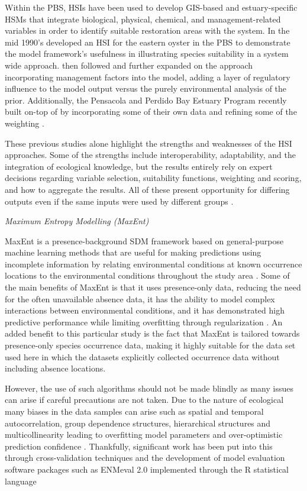 \documentclass[
  review]{elsarticle}
\begin{document}
Within the PBS, HSIs have been used to develop GIS-based and
estuary-specific HSMs that integrate biological, physical, chemical, and
management-related variables in order to identify suitable restoration
areas with the system. In the mid 1990's \citet{Christensen1997}
developed an HSI for the eastern oyster in the PBS to demonstrate the
model framework's usefulness in illustrating species suitability in a
system wide approach. \citet{Geselbracht2024} then followed and further
expanded on the approach incorporating management factors into the
model, adding a layer of regulatory influence to the model output versus
the purely environmental analysis of the prior. Additionally, the
Pensacola and Perdido Bay Estuary Program recently built on-top of
\citet{Geselbracht2024} by incorporating some of their own data and
refining some of the weighting \citep{PPBEP_OysterRestoration}.

These previous studies alone highlight the strengths and weaknesses of
the HSI approaches. Some of the strengths include interoperability,
adaptability, and the integration of ecological knowledge, but the
results entirely rely on expert decisions regarding variable selection,
suitability functions, weighting and scoring, and how to aggregate the
results. All of these present opportunity for differing outputs even if
the same inputs were used by different groups
\citep{Geselbracht2024, Johnson2005}.

\emph{Maximum Entropy Modelling (MaxEnt)}

MaxEnt is a presence-background SDM framework based on general-purpose
machine learning methods that are useful for making predictions using
incomplete information by relating environmental conditions at known
occurrence locations to the environmental conditions throughout the
study area \citep{Phillips2006, Elith2011}. Some of the main benefits of
MaxEnt is that it uses presence-only data, reducing the need for the
often unavailable absence data, it has the ability to model complex
interactions between environmental conditions, and it has demonstrated
high predictive performance while limiting overfitting through
regularization \citep{Phillips2009, Merow2013, Elith2011}. An added
benefit to this particular study is the fact that MaxEnt is tailored
towards presence-only species occurrence data, making it highly suitable
for the data set used here in which the \citet{FWC2026Oysters} datasets
explicitly collected occurrence data without including absence
locations.

However, the use of such algorithms should not be made blindly as many
issues can arise if careful precautions are not taken. Due to the nature
of ecological many biases in the data samples can arise such as spatial
and temporal autocorrelation, group dependence structures, hierarchical
structures and multicollinearity leading to overfitting model parameters
and over-optimistic prediction confidence
\citep{Dormann2013, Kass2021, Roberts2017}. Thankfully, significant work
has been put into this through cross-validation techniques and the
development of model evaluation software packages such as ENMeval 2.0
implemented through the R statistical language
\citep{Kass2021, Roberts2017}
\end{document}
